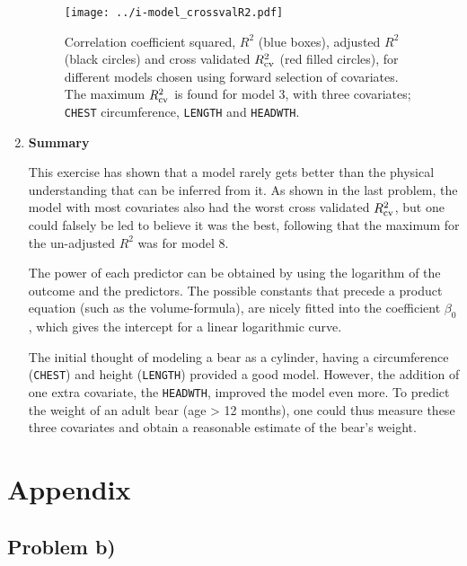 \documentclass[a4paper,11pt]{article}
\begin{document}
\begin{enumerate}[resume*]
        \begin{figure}[htb]
            \centering
            \texttt{[image: ../i-model\_crossvalR2.pdf]}
            \caption{Correlation coefficient squared, $R^2$ (blue boxes), adjusted $R^2$ (black circles) and cross validated $R^2_{\rm cv}$ (red filled circles), for different models chosen using forward selection of covariates. The maximum $R^2_{\rm cv}$ is found for model 3, with three covariates; \texttt{CHEST} circumference, \texttt{LENGTH} and \texttt{HEADWTH}. }
            \label{fig:i}
        \end{figure}

    \item \textbf{Summary}

        This exercise has shown that a model rarely gets better than the physical understanding that can be inferred from it. As shown in the last problem, the model with most covariates also had the worst cross validated $R^2_{\rm cv}$, but one could falsely be led to believe it was the best, following that the maximum for the un-adjusted $R^2$ was for model 8.

        The power of each predictor can be obtained by using the logarithm of the outcome and the predictors. The possible constants that precede a product equation (such as the volume-formula), are nicely fitted into the coefficient $\beta_0$, which gives the intercept for a linear logarithmic curve.

        The initial thought of modeling a bear as a cylinder, having a circumference (\texttt{CHEST}) and height (\texttt{LENGTH}) provided a good model. However, the addition of one extra covariate, the \texttt{HEADWTH}, improved the model even more. To predict the weight of an adult bear (age > 12 months), one could thus measure these three covariates and obtain a reasonable estimate of the bear's weight.

\end{enumerate}



%
%

\clearpage
\appendix
\section{Appendix}
\label{sec:appendix}

\subsection{Problem b)}
\label{app:b}
\end{document}
